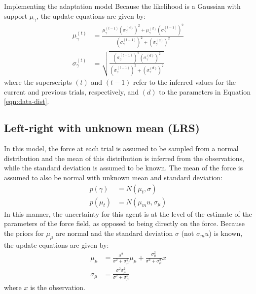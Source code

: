 \documentclass{report}
\def \eref #1{Equation \ref{#1}}   %
\begin{document}
\begin{chapter}{Implementing the adaptation model}
Because the likelihood is a Gaussian with support $\mu_\gamma$, the update
equations are given by:
\begin{align}
  \mu_\gamma^{(t)} &= \frac{\mu_\gamma^{(t-1)}\left(\sigma_\gamma^{(d)}\right)^2 + \mu_\gamma^{(d)}\left(\sigma_\gamma^{(t-1)}\right)^2}{\left(\sigma_\gamma^{(t-1)}\right)^2 + \left(\sigma_\gamma^{(d)}\right)^2} \\
  \sigma_\gamma^{(t)} & = \sqrt{\frac{\left(\sigma_\gamma^{(t-1)}\right)^2\left(\sigma_\gamma^{(d)}\right)^2}{\left(\sigma_\gamma^{(t-1)}\right)^2 + \left(\sigma_\gamma^{(d)}\right)^2}}
\end{align}
where the superscripts $(t)$ and $(t-1)$ refer to the inferred values for the current and previous trials, respectively, and $(d)$ to the parameters in \eref{eqn:data-dist}.

\subsection{Left-right with unknown mean (LRS)}
In this model, the force at each trial is assumed to be sampled from a normal
distribution and the mean of this distribution is inferred from the
observations, while the standard deviation is assumed to be known. The mean of
the force is assumed to also be normal with unknown mean and standard
deviation:
\begin{align}
  p(\gamma) &= N(\mu_t, \sigma) \\
  p(\mu_t) &= N(\mu_mu, \sigma_\mu)
\end{align}
In this manner, the uncertainty for this agent is at the level of the estimate
of the parameters of the force field, as opposed to being directly on the
force. Because the priors for $\mu_\mu$ are normal and the standard deviation
$\sigma$ (not $\sigma_mu$) is known, the update equations are given by:
\begin{align}
  \mu_\mu &= \frac{\sigma^2}{\sigma^2 + \sigma_\mu^2}\mu_\mu + \frac{\sigma_\mu^2}{\sigma^2 + \sigma_\mu^2} x \\
  \sigma_\mu &= \frac{\sigma^2\sigma_\mu^2}{\sigma^2 + \sigma_\mu^2}
\end{align}
where $x$ is the observation.


\end{chapter}
\end{document}
